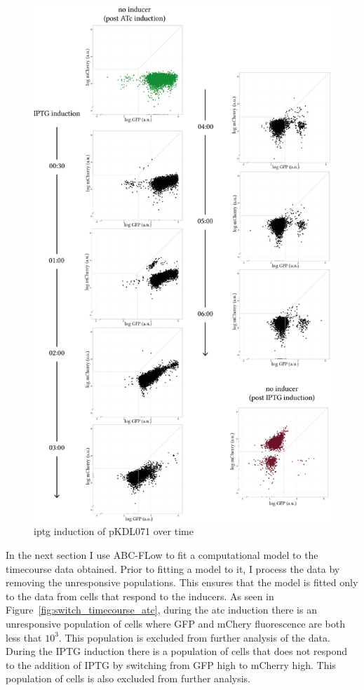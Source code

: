 \begin{figure}[tb]
	\begin{center}
\includegraphics[scale=0.7]{../../chapters/chapterABCFlow/images/pKDL071_iptg_time.png}
\caption[\acrshort{iptg} induction of pKDL071 over time]{\label{fig:switch_timecourse_iptg} \acrshort{iptg} induction of pKDL071 over time}
\end{center}
\end{figure}
\clearpage

In the next section I use ABC-FLow to fit a computational model to the timecourse data obtained. Prior to fitting a model to it, I process the data by removing the unresponsive populations. This ensures that the model is fitted only to the data from cells that respond to the inducers. As seen in Figure~\ref{fig:switch_timecourse_atc}, during the \acrshort{atc} induction there is an unresponsive population of cells where GFP and mChery fluorescence are both less that $10^3$. This population is excluded from further analysis of the data. During the IPTG induction there is a population of cells that does not respond to the addition of IPTG by switching from GFP high to mCherry high. This population of cells is also excluded from further analysis. 

